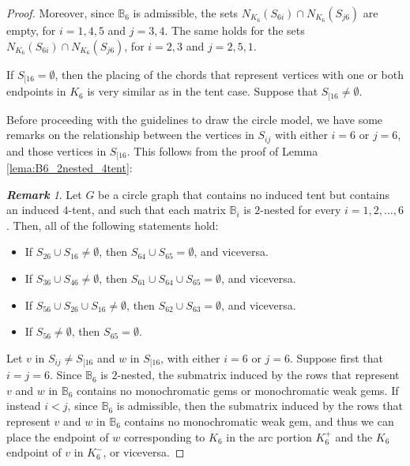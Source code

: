 \documentclass[12pt]{book}
\theoremstyle{plain}
\theoremstyle{remark}
\newtheorem{remark}[teo]{\textbf{\textit{Remark}}}
\begin{document}
\begin{proof}
Moreover, since $\mathbb B_6$ is admissible, the sets $N_{K_6}(S_{6i}) \cap N_{K_6}(S_{j6})$ are empty, for $i = 1, 4, 5$ and $j =3,4$. The same holds for the sets $N_{K_6}(S_{6i}) \cap N_{K_6}(S_{j6})$, for $i = 2, 3$ and $j =2, 5, 1$.

If $S_{[16}= \emptyset$, then the placing of the chords that represent vertices with one or both endpoints in $K_6$ is very similar as in the tent case. Suppose that $S_{[16} \neq \emptyset$.


\vspace{1mm}
Before proceeding with the guidelines to draw the circle model, we have some remarks on the relationship between the vertices in $S_{ij}$ with either $i=6$ or $j=6$, and those vertices in $S_{[16}$. This follows from the proof of Lemma \ref{lema:B6_2nested_4tent}: 

\begin{remark} \label{obs:4tent_guidelines_model}
Let $G$ be a circle graph that contains no induced tent but contains an induced $4$-tent, and such that each matrix $\mathbb B_i$ is $2$-nested for every $i=1,2, \ldots, 6$. Then, all of the following statements hold:
\begin{itemize}
\item If $S_{26} \cup S_{16} \neq \emptyset$, then $S_{64} \cup S_{65} = \emptyset$, and viceversa.
\item If $S_{36} \cup S_{46} \neq \emptyset$, then $S_{61} \cup S_{64} \cup S_{65} = \emptyset$, and viceversa.
\item If $S_{56} \cup S_{26} \cup S_{16} \neq \emptyset$, then $S_{62} \cup S_{63} = \emptyset$, and viceversa.	
\item If $S_{56} \neq \emptyset$, then $S_{65} = \emptyset$.
\end{itemize}
\end{remark}

Let $v$ in $S_{ij} \neq S_{[16}$ and $w$ in $S_{[16}$, with either $i=6$ or $j=6$.
Suppose first that $i=j=6$. Since $\mathbb B_6$ is $2$-nested, the submatrix induced by the rows that represent $v$ and $w$ in $\mathbb B_6$ contains no monochromatic gems or monochromatic weak gems.
If instead $i<j$, since $\mathbb B_6$ is admissible, then the submatrix induced by the rows that represent $v$ and $w$ in $\mathbb B_6$ contains no monochromatic weak gem, and thus we can place the endpoint of $w$ corresponding to $K_6$ in the arc portion $K^+_6$ and the $K_6$ endpoint of $v$ in $K^-_6$, or viceversa.



\end{proof}
\end{document}
